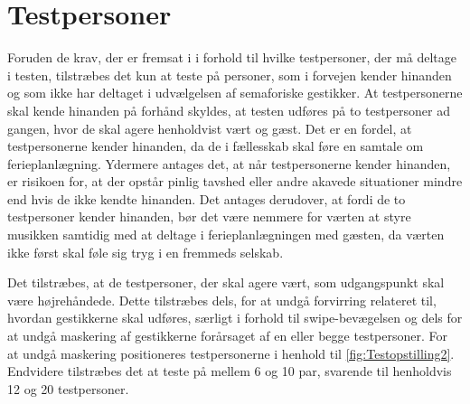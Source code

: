 \section{Testpersoner}
\label{TestpersonerSocialAccept}
%
Foruden de krav, der er fremsat i  i forhold til hvilke testpersoner, der må deltage i testen, tilstræbes det kun at teste på personer, som i forvejen kender hinanden og som ikke har deltaget i udvælgelsen af semaforiske gestikker. At testpersonerne skal kende hinanden på forhånd skyldes, at testen udføres på to testpersoner ad gangen, hvor de skal agere henholdvist vært og gæst. Det er en fordel, at testpersonerne kender hinanden, da de i fællesskab skal føre en samtale om ferieplanlægning. Ydermere antages det, at når testpersonerne kender hinanden, er risikoen for, at der opstår pinlig tavshed eller andre akavede situationer mindre end hvis de ikke kendte hinanden. Det antages derudover, at fordi de to testpersoner kender hinanden, bør det være nemmere for værten at styre musikken samtidig med at deltage i ferieplanlægningen med gæsten, da værten ikke først skal føle sig tryg i en fremmeds selskab. 

Det tilstræbes, at de testpersoner, der skal agere vært, som udgangspunkt skal være højrehåndede. Dette tilstræbes dels, for at undgå forvirring relateret til, hvordan gestikkerne skal udføres, særligt i forhold til swipe-bevægelsen og dels for at undgå maskering af gestikkerne forårsaget af en eller begge testpersoner. For at undgå maskering positioneres testpersonerne i henhold til \autoref{fig:Testopstilling2}. Endvidere tilstræbes det at teste på mellem 6 og 10 par, svarende til henholdvis 12 og 20 testpersoner. 